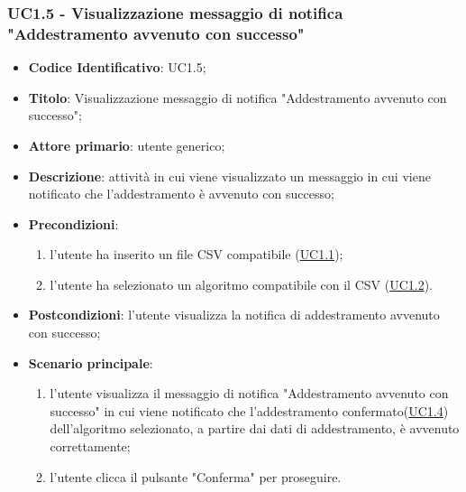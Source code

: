 	\label{par:UC1.5}
	\subsubsection{UC1.5 - Visualizzazione messaggio di notifica "Addestramento avvenuto con successo"}
		\begin{itemize}
			\item\textbf{Codice Identificativo}: UC1.5;
			\item\textbf{Titolo}: Visualizzazione messaggio di notifica "Addestramento avvenuto con successo";
			\item\textbf{Attore primario}: utente generico;
			\item\textbf{Descrizione}: attività in cui viene visualizzato un messaggio in cui viene notificato che l'addestramento è avvenuto con successo;
			\item\textbf{Precondizioni}: 
				\begin{enumerate}
					\item l'utente ha inserito un file CSV compatibile (\hyperref[par:UC1.1]{UC1.1});
					\item l'utente ha selezionato un algoritmo compatibile con il CSV  (\hyperref[par:UC1.2]{UC1.2}).
				\end{enumerate}
			\item\textbf{Postcondizioni}: l'utente visualizza la notifica di addestramento avvenuto con successo;					
			\item\textbf{Scenario principale}:
				\begin{enumerate}
					\item l'utente visualizza il messaggio di notifica "Addestramento avvenuto con successo" in cui viene notificato che l'addestramento confermato(\hyperref[par:UC1.4]{UC1.4}) dell'algoritmo selezionato, a partire dai dati di addestramento, è avvenuto correttamente;
					\item l'utente clicca il pulsante "Conferma" per proseguire.		
				\end{enumerate}		
		\end{itemize}
		
	\label{par:UC1.6}
